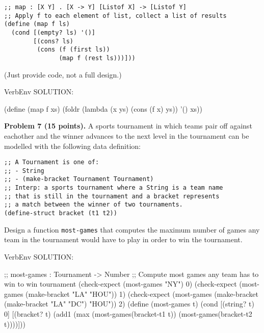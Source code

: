 \documentclass[12pt]{article}
\begin{document}
\begin{verbatim}
;; map : [X Y] . [X -> Y] [Listof X] -> [Listof Y]
;; Apply f to each element of list, collect a list of results
(define (map f ls)
  (cond [(empty? ls) '()]
        [(cons? ls)
         (cons (f (first ls))
               (map f (rest ls)))]))
\end{verbatim}

\noindent
(Just provide code, not a full design.)

\begin{SaveVerbatim}{VerbEnv}
SOLUTION:

(define (map f xs)
  (foldr (lambda (x ys) (cons (f x) ys)) '() xs))
\end{SaveVerbatim}



\newpage

\noindent
{\bf Problem 7 (15 points).}
%
A sports tournament in which teams pair off against eachother and
the winner advances to the next level in the tournament can be modelled
with the following data definition:

\begin{verbatim}
;; A Tournament is one of:
;; - String
;; - (make-bracket Tournament Tournament)
;; Interp: a sports tournament where a String is a team name
;; that is still in the tournament and a bracket represents
;; a match between the winner of two tournaments. 
(define-struct bracket (t1 t2))
\end{verbatim}

Design a function {\tt most-games} that computes the maximum number of
games any team in the tournament would have to play in order to win
the tournament.


\begin{SaveVerbatim}{VerbEnv}
SOLUTION:

;; most-games : Tournament -> Number
;; Compute most games any team has to win to win tournament
(check-expect (most-games "NY") 0)
(check-expect (most-games (make-bracket "LA" "HOU")) 1)
(check-expect (most-games (make-bracket (make-bracket "LA" "DC") "HOU")) 2)
(define (most-games t)
  (cond [(string? t) 0]
        [(bracket? t)
         (add1 (max (most-games(bracket-t1 t))
                    (most-games(bracket-t2 t))))]))
\end{SaveVerbatim}

\end{document}
